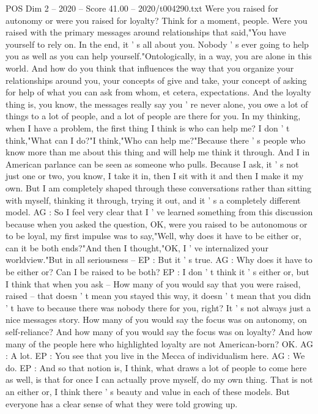 \begin{textsample}{POS Dim 2 – 2020 – Score 41.00 – 2020/t004290.txt}
Were you raised for autonomy or were you raised for loyalty?
Think for a moment, people.
Were you raised with the primary messages around relationships that said,"You have yourself to rely on.
In the end, it ' s all about you.
Nobody ' s ever going to help you as well as you can help yourself."Ontologically, in a way, you are alone in this world.
And how do you think that influences the way that you organize your relationships around you, your concepts of give and take, your concept of asking for help of what you can ask from whom, et cetera, expectations.
And the loyalty thing is, you know, the messages really say you ' re never alone, you owe a lot of things to a lot of people, and a lot of people are there for you.
In my thinking, when I have a problem, the first thing I think is who can help me?
I don ' t think,"What can I do?"I think,"Who can help me?"Because there ' s people who know more than me about this thing and will help me think it through.
And I in American parlance can be seen as someone who pulls.
Because I ask, it ' s not just one or two, you know, I take it in, then I sit with it and then I make it my own.
But I am completely shaped through these conversations rather than sitting with myself, thinking it through, trying it out, and it ' s a completely different model.
AG : So I feel very clear that I ' ve learned something from this discussion because when you asked the question, OK, were you raised to be autonomous or to be loyal, my first impulse was to say,"Well, why does it have to be either or, can it be both ends?"And then I thought,"OK, I ' ve internalized your worldview."But in all seriousness -- EP : But it ' s true.
AG : Why does it have to be either or?
Can I be raised to be both?
EP : I don ' t think it ' s either or, but I think that when you ask -- How many of you would say that you were raised, raised -- that doesn ' t mean you stayed this way, it doesn ' t mean that you didn ' t have to because there was nobody there for you, right?
It ' s not always just a nice messages story.
How many of you would say the focus was on autonomy, on self-reliance?
And how many of you would say the focus was on loyalty?
And how many of the people here who highlighted loyalty are not American-born?
OK.
AG : A lot.
EP : You see that you live in the Mecca of individualism here.
AG : We do.
EP : And so that notion is, I think, what draws a lot of people to come here as well, is that for once I can actually prove myself, do my own thing.
That is not an either or, I think there ' s beauty and value in each of these models.
But everyone has a clear sense of what they were told growing up.

\end{textsample}
